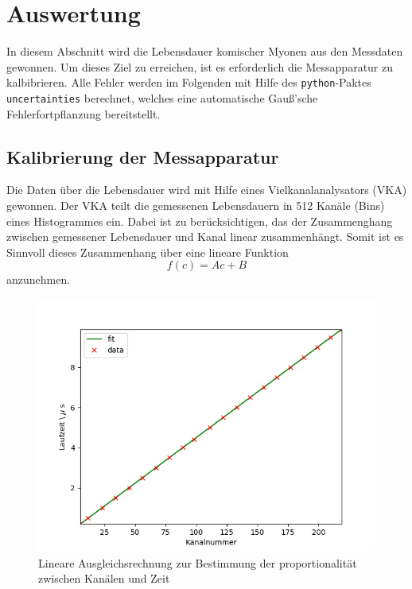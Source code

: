 \section{Auswertung}
\label{sec:evaluation}
In diesem Abschnitt wird die Lebensdauer komischer Myonen aus den Messdaten gewonnen.
Um dieses Ziel zu erreichen, ist es erforderlich die Messapparatur zu kalbibrieren.
Alle Fehler werden im Folgenden mit Hilfe
des \texttt{python}-Paktes \texttt{uncertainties} \cite{uncertain} berechnet, welches eine automatische
Gauß'sche Fehlerfortpflanzung bereitstellt.

\subsection{Kalibrierung der Messapparatur}
\label{subsec:calibration}
Die Daten über die Lebensdauer wird mit Hilfe eines Vielkanalanalysators (VKA) gewonnen. Der VKA teilt die gemessenen Lebensdauern in \num{512} Kanäle (Bins) eines Histogrammes ein. Dabei ist zu berücksichtigen, das der Zusammenghang zwischen gemessener Lebensdauer und Kanal linear zusammenhängt. Somit ist es Sinnvoll dieses Zusammenhang über eine lineare Funktion
\begin{equation}
f(c) = Ac + B
\end{equation}
anzunehmen.

\begin{figure}[h!]
	\centering
	\includegraphics[width=\textwidth]{img/calib.png}
	\caption{Lineare Ausgleichsrechnung zur Bestimmung der proportionalität zwischen Kanälen und Zeit}
	\label{abb:cal}
\end{figure}

